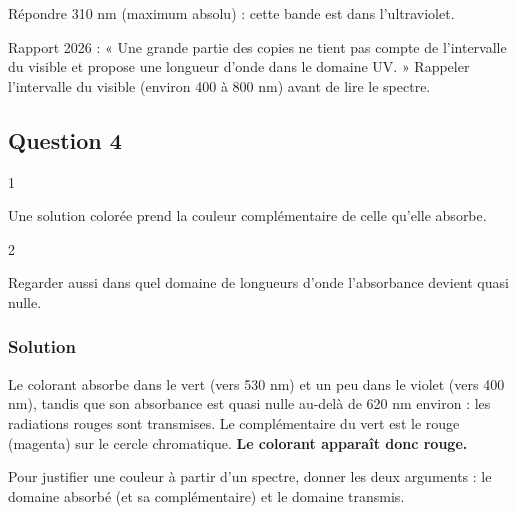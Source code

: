 \documentclass[11pt,a4paper]{article}
\begin{document}
\begin{piege}

Répondre 310 nm (maximum absolu) : cette bande est dans l'ultraviolet.

\end{piege}

\begin{jury}

Rapport 2026 : « Une grande partie des copies ne tient pas compte de l'intervalle du visible et propose une longueur d'onde dans le domaine UV. » Rappeler l'intervalle du visible (environ 400 à 800 nm) avant de lire le spectre.

\end{jury}

\hypertarget{question-4}{%
\subsection{Question 4}\label{question-4}}

\begin{indication}{1}

Une solution colorée prend la couleur complémentaire de celle qu'elle absorbe.

\end{indication}

\begin{indication}{2}

Regarder aussi dans quel domaine de longueurs d'onde l'absorbance devient quasi nulle.

\end{indication}

\hypertarget{solution-3}{%
\subsubsection{Solution}\label{solution-3}}

Le colorant absorbe dans le vert (vers 530 nm) et un peu dans le violet (vers 400 nm), tandis que son absorbance est quasi nulle au-delà de 620 nm environ : les radiations rouges sont transmises. Le complémentaire du vert est le rouge (magenta) sur le cercle chromatique. \textbf{Le colorant apparaît donc rouge.}

\begin{methode}

Pour justifier une couleur à partir d'un spectre, donner les deux arguments : le domaine absorbé (et sa complémentaire) et le domaine transmis.

\end{methode}
\end{document}
